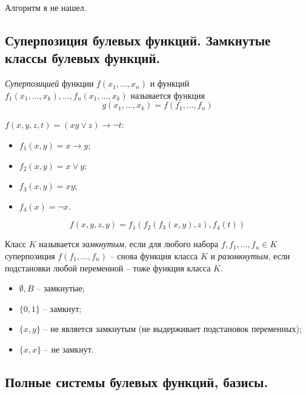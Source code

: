 Алгоритм я не нашел.

\subsection{Суперпозиция булевых функций. Замкнутые классы булевых функций.}

\begin{definition}
    \emph{Суперпозицией} функции $f(x_1,\ldots,x_n)$ и функций $f_1(x_1,\ldots,x_k),\ldots,f_n(x_1,\ldots,x_k)$ называется функция
    \[
        g(x_1,\ldots,x_k) = f(f_1,\ldots,f_n)
    \]
\end{definition}

\begin{example}
    $f(x,y,z,t) = (xy \lor z)\rightarrow \lnot t$:
    \begin{itemize}
        \item $f_1(x,y) = x \rightarrow y$;
        \item $f_2(x,y) = x \lor y$;
        \item $f_3(x,y) = xy$;
        \item $f_4(x) = \lnot x$.
    \end{itemize}
    \[
        f(x,y,z,y) = f_1(f_2(f_3(x,y),z),f_4(t))
    \]
\end{example}

\begin{definition}
    Класс $K$ называется \emph{замкнутым}, если для любого набора $f,f_1,\ldots,f_n \in K$ суперпозиция $f(f_1,\ldots,f_n)$ -- снова функция класса $K$ и \emph{разомкнутым}, если подстановки любой переменной -- тоже функция класса $K$.
\end{definition}

\begin{example}\leavevmode
    \begin{itemize}
        \item $\emptyset, B$ -- замкнутые;
        \item $\{0,1\}$ -- замкнут;
        \item $\{x,y\}$ -- не является замкнутым (не выдерживает подстановок переменных);
        \item $\{x,x\}$ -- не замкнут.
    \end{itemize}
\end{example}

\subsection{Полные системы булевых функций, базисы.}

